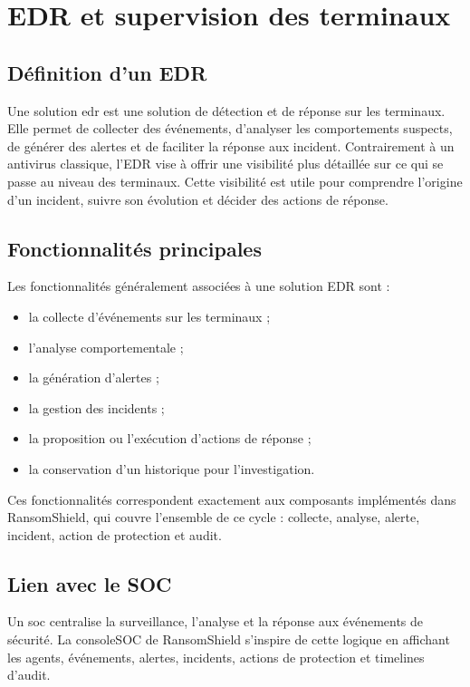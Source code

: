 \section{EDR et supervision des terminaux}

\subsection{Définition d'un EDR}

Une solution \gls{edr} est une solution de détection et de réponse sur les terminaux. Elle permet de collecter des événements, d'analyser les comportements suspects, de générer des alertes et de faciliter la réponse aux \gls{incident}. Contrairement à un antivirus classique, l'EDR vise à offrir une visibilité plus détaillée sur ce qui se passe au niveau des terminaux. Cette visibilité est utile pour comprendre l'origine d'un incident, suivre son évolution et décider des actions de réponse.

\subsection{Fonctionnalités principales}

Les fonctionnalités généralement associées à une solution EDR sont :

\begin{itemize}
    \item la collecte d'événements sur les terminaux ;
    \item l'analyse comportementale ;
    \item la génération d'alertes ;
    \item la gestion des incidents ;
    \item la proposition ou l'exécution d'actions de réponse ;
    \item la conservation d'un historique pour l'investigation.
\end{itemize}

\noindent Ces fonctionnalités correspondent exactement aux composants implémentés dans RansomShield, qui couvre l'ensemble de ce cycle : collecte, analyse, alerte, incident, action de protection et audit.

\subsection{Lien avec le SOC}

Un \gls{soc} centralise la surveillance, l'analyse et la réponse aux événements de sécurité. La \gls{consoleSOC} de RansomShield s'inspire de cette logique en affichant les agents, événements, alertes, incidents, actions de protection et timelines d'audit.

